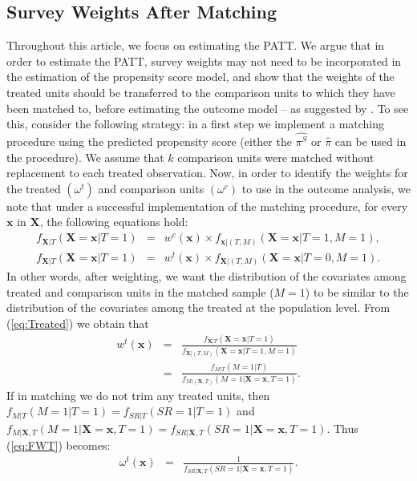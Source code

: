 \documentclass[oupdraft]{bio}
\begin{document}
\subsection{Survey Weights After Matching}
\label{S2.2}
Throughout this article, we focus on estimating the PATT.
We argue that in order to estimate the PATT, survey weights may not need to be incorporated in the estimation of the propensity score model, and show that the weights of the treated units should be transferred to the comparison units to which they have been matched to, before estimating the outcome model -- as suggested by 
\citet{reardon2009effect}. To see this, consider the following strategy: in a first step we implement a matching procedure using the predicted propensity score (either the $\widehat{\pi^{S}}$ or $\widehat{\pi}$ can be used in the procedure). We assume that $k$ comparison units were matched without replacement to each treated observation. Now, in order to identify the weights for the treated $\left(\omega^{t}\right)$ and comparison units $\left(\omega^{c}\right)$ to use in the outcome analysis, we note that under a successful implementation of the matching procedure, for every $\mathbf{x}$ in $\mathbf{X}$, the following equations hold:
\begin{eqnarray}
f_{\mathbf{X}|T}(\mathbf{X=x}|T=1) & = & w^{c}(\textbf{x})\times f_{\mathbf{x}|(T,M)}(\mathbf{X=x}|T=1,M=1),\label{eq:Control}\\
f_{\mathbf{X}|T}(\mathbf{X=x}|T=1) & = & w^{t}(\textbf{x})\times f_{\mathbf{X}|(T,M)}(\mathbf{X=x}|T=0,M=1).\label{eq:Treated}
\end{eqnarray}
In other words, after weighting, we want the distribution of the covariates among treated and comparison units in the matched sample ($M=1$) to be similar to the distribution of the covariates among the treated at the population level.
From (\ref{eq:Treated}) we obtain that
\begin{eqnarray}
w^{t}(\textbf{x}) & = & \frac{f_{\mathbf{X}|T}(\mathbf{X=x}|T=1)}{f_{\mathbf{X}|(T,M)}(\mathbf{X=x}|T=1,M=1)}\nonumber \\
 & = & \frac{f_{M|T}(M=1|T)}{f_{M|(\mathbf{X},T)}(M=1|\mathbf{X=x},T=1)}.\label{eq:FWT}
\end{eqnarray}
If in matching we do not trim any treated units, then $f_{M|T}(M=1|T=1) =  f_{SR|T}(SR=1|T=1)$ and $f_{M|\mathbf{X},T}(M=1|\mathbf{X=x},T=1)  =  f_{SR|\mathbf{X},T}(SR=1|\mathbf{X=x},T=1)$. Thus (\ref{eq:FWT}) becomes:
\begin{eqnarray}
\omega^{t}(\textbf{x}) &=& \frac{1}{f_{SR|\mathbf{X},T}(SR=1|\mathbf{X=x},T=1)}.\label{eq:IDK}
\end{eqnarray}
\end{document}
